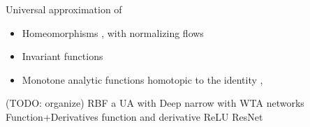 \documentclass{article}
\newcommand{\ascomment}[1]{\textcolor{ascolor}{(#1)}}
\newcounter{ct}
\begin{document}
Universal approximation of 
\begin{itemize}
\item Homeomorphisms  \citep{zhang2020approximation}, with normalizing flows  \citep{papamakarios2021normalizing}
\item Invariant functions \citep{li2022deep}
\item Monotone analytic functions homotopic to the identity \citep{tabuada2020universal},  \citep{tabuada2022universal}
\end{itemize}


\ascomment{TODO: organize}
RBF \citep{park1991universal}
a \citep{marchi2021training}
 \citep{lowe1988multivariable}
 \citep{mhaskar1997neural}
 \citep{leshno1993multilayer}
UA with Deep narrow  \citep{kidger2020universal}
with WTA networks  \citep{maass2000wta}
Function+Derivatives  \citep{hornik1990universal}
function and derivative  \citep{li1996simultaneous}
ReLU \citep{huang2020relu}
ResNet \citep{lin2018resnet}





%
\end{document}
